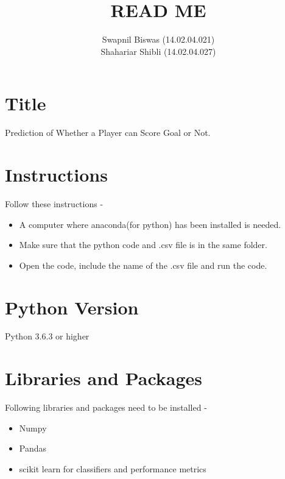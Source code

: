 \documentclass[10pt,a4paper]{article}
\title{\textbf{READ ME}}
\author{Swapnil Biswas (14.02.04.021)\\
		Shahariar Shibli (14.02.04.027)\\
		}
\begin{document}
\maketitle

\section{Title}
Prediction of Whether a Player can Score Goal or Not.

\section{Instructions}
Follow these instructions -
\begin{itemize}
    \item A computer where anaconda(for python) has been installed is needed.
    \item Make sure that the python code and .csv file is in the same folder.
    \item Open the code, include the name of the .csv file and run the code.
\end{itemize}

\section{Python Version}
Python 3.6.3 or higher

\section{Libraries and Packages}
Following libraries and packages need to be installed -
\begin{itemize}
    \item Numpy
    \item Pandas
    \item scikit learn for classifiers and performance metrics
\end{itemize}
    
\end{document}
